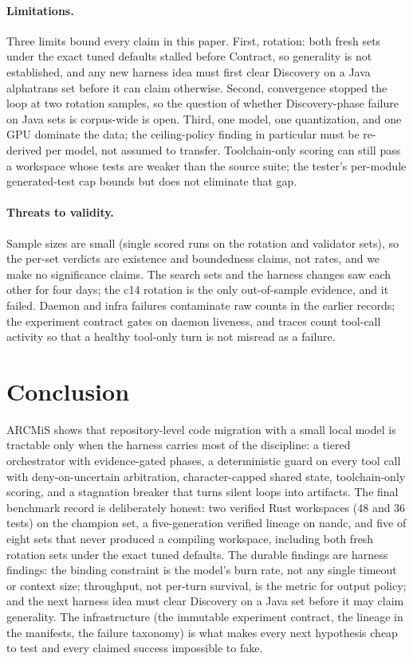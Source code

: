 \documentclass[11pt]{article}
\begin{document}
\paragraph{Limitations.}
Three limits bound every claim in this paper. First, rotation: both
fresh sets under the exact tuned defaults stalled before Contract, so
generality is not established, and any new harness idea must first clear
Discovery on a Java alphatrans set before it can claim otherwise. Second,
convergence stopped the loop at two rotation samples, so the question of
whether Discovery-phase failure on Java sets is corpus-wide is open.
Third, one model, one quantization, and one GPU dominate the data; the
ceiling-policy finding in particular must be re-derived per model, not
assumed to transfer. Toolchain-only scoring can still pass a workspace
whose tests are weaker than the source suite; the tester's per-module
generated-test cap bounds but does not eliminate that gap.

\paragraph{Threats to validity.}
Sample sizes are small (single scored runs on the rotation and validator
sets), so the per-set verdicts are existence and boundedness claims, not
rates, and we make no significance claims. The search sets and the
harness changes saw each other for four days; the c14 rotation is the
only out-of-sample evidence, and it failed. Daemon and infra failures
contaminate raw counts in the earlier records; the experiment contract
gates on daemon liveness, and traces count tool-call activity so that a
healthy tool-only turn is not misread as a failure.

\section{Conclusion}

ARCMiS shows that repository-level code migration with a small local
model is tractable only when the harness carries most of the discipline:
a tiered orchestrator with evidence-gated phases, a deterministic guard
on every tool call with deny-on-uncertain arbitration, character-capped
shared state, toolchain-only scoring, and a stagnation breaker that turns
silent loops into artifacts. The final benchmark record is deliberately
honest: two verified Rust workspaces (48 and 36 tests) on the champion
set, a five-generation verified lineage on nandc, and five of eight sets
that never produced a compiling workspace, including both fresh rotation
sets under the exact tuned defaults. The durable findings are harness
findings: the binding constraint is the model's burn rate, not any
single timeout or context size; throughput, not per-turn survival, is
the metric for output policy; and the next harness idea must clear
Discovery on a Java set before it may claim generality. The
infrastructure (the immutable experiment contract, the lineage in the
manifests, the failure taxonomy) is what makes every next hypothesis
cheap to test and every claimed success impossible to fake.



\end{document}
